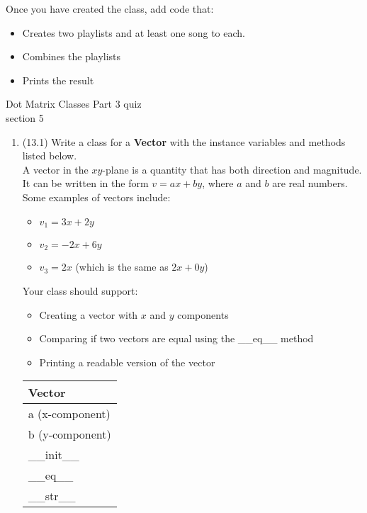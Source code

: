 \documentclass{article}
\begin{document}
\begin{enumerate}
		Once you have created the class, add code that:
		\begin{itemize}
			\item Creates two playlists and at least one song to each.
			\item Combines the playlists
			\item Prints the result
		\end{itemize}



\end{enumerate}
\pagebreak
Dot Matrix \hfill Classes Part 3 quiz\\
section 5\\
\begin{enumerate}
\item (13.1)
		Write a class for a \textbf{Vector} with the instance variables and methods listed below.\\
		A vector in the $xy$-plane is a quantity that has both direction and magnitude.\\ It can 
		be written in the form $v = ax + by$, where $a$ and $b$ are real numbers.\\[0.5em]
		Some examples of vectors include:
		
		\begin{minipage}[t]{0.65\textwidth}
			\begin{itemize}
				\item $v_1 = 3x + 2y$
				\item $v_2 = -2x + 6y$
				\item $v_3 = 2x$ (which is the same as $2x + 0y$)
			\end{itemize}

			Your class should support:
			\begin{itemize}
				\item Creating a vector with $x$ and $y$ components
				\item Comparing if two vectors are equal using the \_\_eq\_\_ method
				\item Printing a readable version of the vector
			\end{itemize}
		\end{minipage}
		\hfill
		\begin{minipage}[t]{0.32\textwidth}
			\vspace{-1.2em} %
			\begin{flushright}
				\begin{tabular}{|l|}
					\hline
					Vector \\ \hline
					a (x-component) \\
					b (y-component) \\ \hline
					\_\_init\_\_ \\
					\_\_eq\_\_ \\
					\_\_str\_\_ \\ \hline
				\end{tabular}
			\end{flushright}
		\end{minipage}
		

\end{enumerate}
\end{document}
